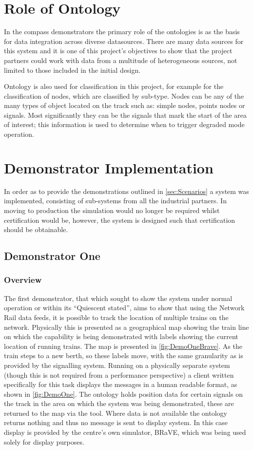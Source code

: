  \section{Role of Ontology}

In the compass demonstrators the primary role of the ontologies is as the basis for data integration across diverse datasources. There are many data sources for this system and it is one of this project's objectives to show that the project partners could work with data from a multitude of heterogeneous sources, not limited to those included in the initial design. 

Ontology is also used for classification in this project, for example for the classification of nodes, which are classified by sub-type. Nodes can be any of the many types of object located on the track such as: simple nodes, points nodes or signals. Most significantly they can be the signals that mark the start of the area of interest; this information is used to determine when to trigger degraded mode operation.

\section{Demonstrator Implementation}
In order as to provide the demonstrations outlined in \autoref{sec:Scenarios} a system was implemented, consisting of sub-systems from all the industrial partners. In moving to production the simulation would no longer be required whilst certification would be, however, the system is designed such that certification should be obtainable. 

\subsection{Demonstrator One}
\subsubsection{Overview}
 
The first demonstrator, that which sought to show the system under normal operation or within its ``Quiescent stated'', aims to show that using the Network Rail data feeds, it is possible to track the location of multiple trains on the network. Physically this is presented as a geographical map showing the train line on which the capability is being demonstrated with labels showing the current location of running trains. The map is presented in \autoref{fig:DemoOneBrave}. As the train steps to a new berth, so these labels move, with the same granularity as is provided by the signalling system. Running on a physically separate system (though this is not required from a performance perspective) a client written specifically for this task displays the messages in a human readable format, as shown in \autoref{fig:DemoOne}. The ontology holds position data for certain signals on the track in the area on which the system was being demonstrated, these are returned to the map via the tool. Where data is not available the ontology returns nothing and thus no message is sent to display system. In this case display is provided by the centre's own simulator, BRaVE, which was being used solely for display purposes.

